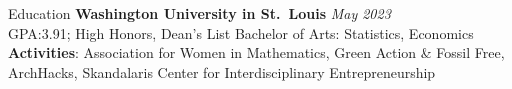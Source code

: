 \begin{rSection}{Education}
  {\bf Washington University in St.\ Louis} \hfill \textit{May 2023} \smallskip \\
  {GPA:\@ 3.91; High Honors, Dean's List} \hfill {Bachelor of Arts: Statistics, Economics} \smallskip \\
  \textbf{Activities}: Association for Women in Mathematics, Green Action \& Fossil Free, ArchHacks, Skandalaris Center for Interdisciplinary Entrepreneurship

\vspace{-1mm}
\ifx\nocoursework\undefined
\else\fi

\end{rSection}
